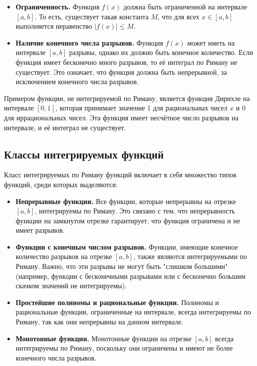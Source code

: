 \begin{itemize} \item \textbf{Ограниченность.} Функция \( f(x) \) должна быть
			ограниченной на интервале \( [a, b] \). То есть, существует
			такая константа \( M \), что для всех \( x \in [a, b] \)
			выполняется неравенство \( |f(x)| \leq M \).
    
		\item \textbf{Наличие конечного числа разрывов.} Функция \( f(x) \)
			может иметь на интервале \( [a, b] \) разрывы, однако их должно
			быть конечное количество. Если функция имеет бесконечно много
			разрывов, то её интеграл по Риману не существует. Это означает,
			что функция должна быть непрерывной, за исключением конечного
числа разрывов.  \end{itemize}

Примером функции, не интегрируемой по Риману, является функция Дирихле на
интервале \( [0, 1] \), которая принимает значение 1 для рациональных чисел \(
x \) и 0 для иррациональных чисел. Эта функция имеет несчётное число разрывов
на интервале, и её интеграл не существует.

\subsection{Классы интегрируемых функций}

Класс интегрируемых по Риману функций включает в себя множество типов функций,
среди которых выделяются:

\begin{itemize} \item \textbf{Непрерывные функции.} Все функции, которые
			непрерывны на отрезке \( [a, b] \), интегрируемы по Риману. Это
			связано с тем, что непрерывность функции на замкнутом отрезке
			гарантирует, что функция ограничена и не имеет разрывов.
    
		\item \textbf{Функции с конечным числом разрывов.} Функции, имеющие
			конечное количество разрывов на отрезке \( [a, b] \), также
			являются интегрируемыми по Риману. Важно, что эти разрывы не
			могут быть "слишком большими" (например, функции с бесконечными
			разрывами или с бесконечно большим скачком значений не
			интегрируемы).
    
		\item \textbf{Простейшие полиномы и рациональные функции.} Полиномы и
			рациональные функции, ограниченные на интервале, всегда
			интегрируемы по Риману, так как они непрерывны на данном
			интервале.
    
		\item \textbf{Монотонные функции.} Монотонные функции на отрезке \(
			[a, b] \) всегда интегрируемы по Риману, поскольку они
			ограничены и имеют не более конечного числа разрывов.
\end{itemize}

